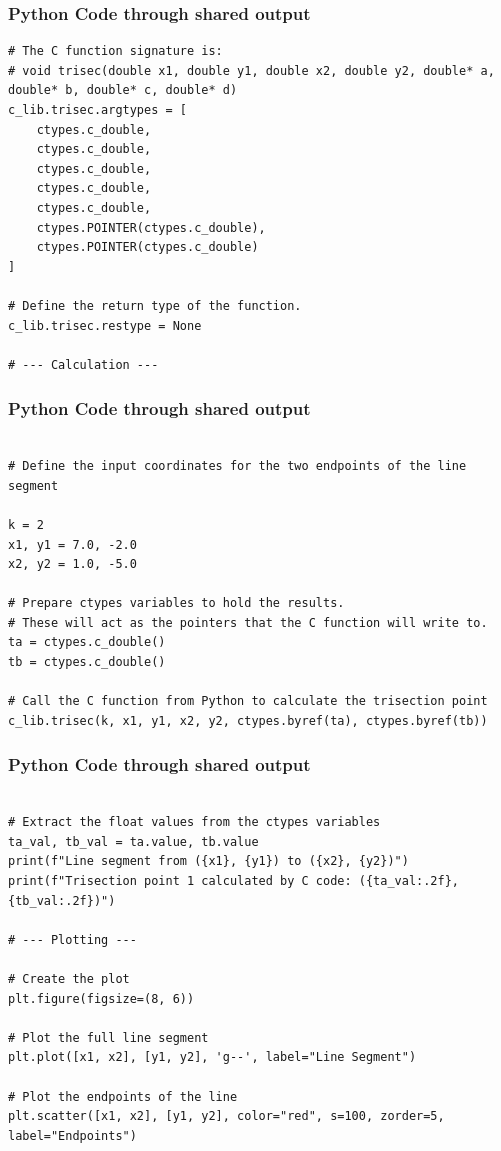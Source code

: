 \documentclass{beamer}
\begin{document}
\begin{frame}[fragile]
\frametitle{Python Code through shared output}
\begin{lstlisting}
# The C function signature is:
# void trisec(double x1, double y1, double x2, double y2, double* a, double* b, double* c, double* d)
c_lib.trisec.argtypes = [
    ctypes.c_double, 
    ctypes.c_double, 
    ctypes.c_double,
    ctypes.c_double, 
    ctypes.c_double, 
    ctypes.POINTER(ctypes.c_double), 
    ctypes.POINTER(ctypes.c_double)
]

# Define the return type of the function.
c_lib.trisec.restype = None

# --- Calculation ---
\end{lstlisting}
\end{frame}

\begin{frame}[fragile]
\frametitle{Python Code through shared output}
\begin{lstlisting}

# Define the input coordinates for the two endpoints of the line segment

k = 2
x1, y1 = 7.0, -2.0
x2, y2 = 1.0, -5.0

# Prepare ctypes variables to hold the results.
# These will act as the pointers that the C function will write to.
ta = ctypes.c_double()
tb = ctypes.c_double()

# Call the C function from Python to calculate the trisection point
c_lib.trisec(k, x1, y1, x2, y2, ctypes.byref(ta), ctypes.byref(tb))
\end{lstlisting}
\end{frame}

\begin{frame}[fragile]
\frametitle{Python Code through shared output}
\begin{lstlisting}

# Extract the float values from the ctypes variables
ta_val, tb_val = ta.value, tb.value
print(f"Line segment from ({x1}, {y1}) to ({x2}, {y2})")
print(f"Trisection point 1 calculated by C code: ({ta_val:.2f}, {tb_val:.2f})")

# --- Plotting ---

# Create the plot
plt.figure(figsize=(8, 6))

# Plot the full line segment
plt.plot([x1, x2], [y1, y2], 'g--', label="Line Segment")

# Plot the endpoints of the line
plt.scatter([x1, x2], [y1, y2], color="red", s=100, zorder=5, label="Endpoints")
\end{lstlisting}
\end{frame}
\end{document}
